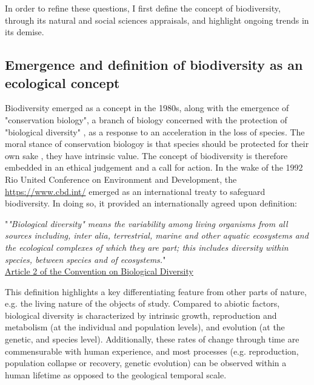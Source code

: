 In order to refine these questions, I first define the concept of biodiversity, through its natural and social sciences appraisals, and highlight ongoing trends in its demise.


\subsection*{Emergence and definition of biodiversity as an ecological concept}

Biodiversity emerged as a concept in the 1980s, along with the emergence of "conservation biology", a branch of biology concerned with the protection of "biological diversity" \citep{soule_what_1985}, as a response to an acceleration in the loss of species. The moral stance of conservation biologoy is that species should be protected for their own sake \citep{soule_conservation_1986}, they have intrinsic value. 
The concept of biodiversity is therefore embedded in an ethical judgement and a call for action. In the wake of the 1992 Rio United Conference on Environment and Development, the \href{Convention on Biological Diversity}{https://www.cbd.int/} emerged as an international treaty to safeguard biodiversity. In doing so, it provided an internationally agreed upon definition:

\begin{displayquote}
"\textit{"Biological diversity" means the variability among living organisms from all sources including, inter alia, terrestrial, marine and other aquatic ecosystems and the ecological complexes of which they are part; this includes diversity within species, between species and of ecosystems.}"\\
\hspace*{\fill} \small{\href{https://www.cbd.int/convention/articles/default.shtml?a=cbd-02}{Article 2 of the Convention on Biological Diversity}}
\end{displayquote}

This definition highlights a key differentiating feature from other parts of nature, e.g. the living nature of the objects of study. Compared to abiotic factors, biological diversity is characterized by intrinsic growth, reproduction and metabolism (at the individual and population levels), and evolution (at the genetic, and species level). Additionally, these rates of change through time are commensurable with human experience, and most processes (e.g. reproduction, population collapse or recovery, genetic evolution) can be observed within a human lifetime as opposed to the geological temporal scale. 

